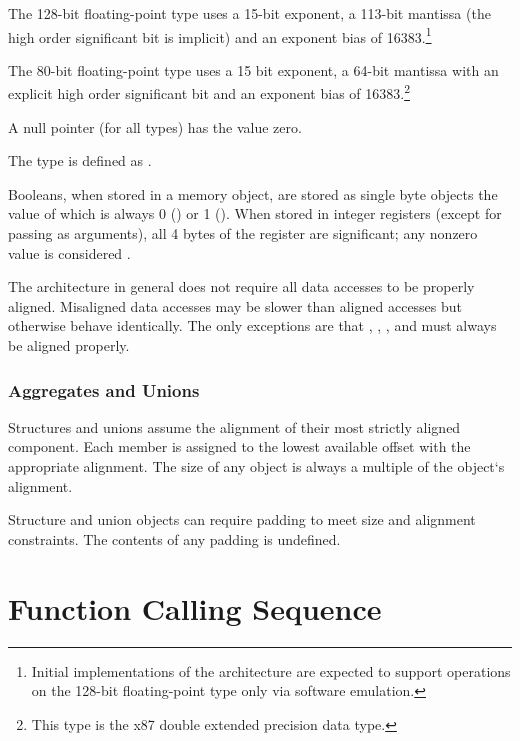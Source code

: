 The 128-bit floating-point type uses a 15-bit exponent, a 113-bit
mantissa (the high order significant bit is implicit) and an exponent
bias of 16383.\footnote{Initial implementations of the \xARCH
  architecture are expected to support operations on the
  128-bit floating-point  type only via software emulation.}

The 80-bit floating-point type uses a 15 bit exponent, a 64-bit mantissa
with an explicit high order significant bit and an exponent bias of
16383.\footnote{This type is the x87 double extended precision data
  type.} 

A null pointer (for all types) has the value zero.

The type  is defined as .

Booleans, when stored in a memory object, are stored as
single byte objects the value of which is always 0 () or 1
().  When stored in integer registers (except for passing
as arguments), all 4 bytes of the register are significant;
any nonzero value is considered .

\begin{sloppypar}
The \xARCH architecture in general
does not require all data accesses to be properly aligned.  Misaligned
data accesses may be slower than aligned accesses
but otherwise behave identically.  The only exceptions are that
, ,  ,
 and  must always be aligned properly.
\end{sloppypar}

\subsubsection{Aggregates and Unions}

Structures and unions assume the alignment of their most strictly
aligned component.  Each member is assigned to the lowest available
offset with the appropriate alignment.  The size of any object is always
a multiple of the object`s alignment.

Structure and union objects can require padding to meet size and
alignment constraints.  The contents of any padding is undefined.


\section{Function Calling Sequence}

